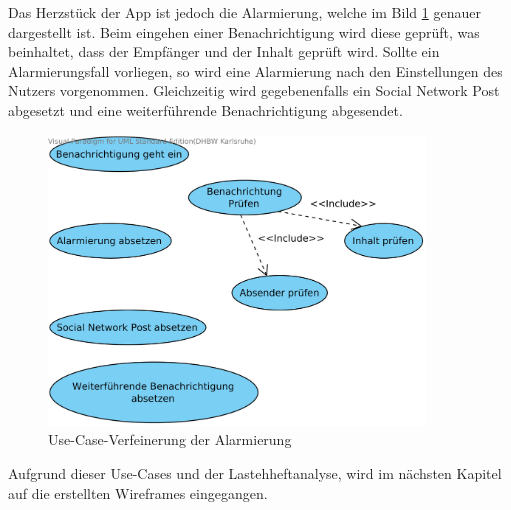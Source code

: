 Das Herzst\"uck der App ist jedoch die Alarmierung, welche im Bild \ref{Alarmierung Use Case} genauer dargestellt ist. Beim eingehen einer Benachrichtigung wird diese gepr\"uft, was beinhaltet, dass der Empf\"anger und der Inhalt gepr\"uft wird. Sollte ein Alarmierungsfall vorliegen, so wird eine Alarmierung nach den Einstellungen des Nutzers vorgenommen. Gleichzeitig wird gegebenenfalls ein Social Network Post abgesetzt und eine weiterf\"uhrende Benachrichtigung abgesendet.
\begin{figure}[!ht]
\centering
\includegraphics[width=10cm]{Bilder/UseCaseAlarmierung.png}
\caption{Use-Case-Verfeinerung der Alarmierung}
\label{Alarmierung Use Case}
\centering
\end{figure}

Aufgrund dieser Use-Cases und der Lastehheftanalyse, wird im n\"achsten Kapitel auf die erstellten Wireframes eingegangen.